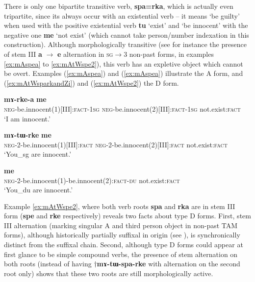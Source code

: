 \documentclass[oneside,a4paper,11pt]{article}
\newcommand{\ipa}[1]{{\phon\textbf{#1}}}
\newcommand{\jpg}[2]{\ipa{#1} `#2'}
\newcommand{\refb}[1]{(\ref{#1})}
\begin{document}
There is only one bipartite transitive verb, \ipa{spa=rka}, which is actually even tripartite, since its always occur with an existential verb -- it means `be guilty' when used with the positive existential verb \jpg{tu}{exist} and  `be innocent' with the negative one \jpg{me}{not exist} (which cannot take person/number indexation in this construction). Although morphologically transitive (see for instance the presence of stem III \ipa{a} $\rightarrow$ \ipa{e} alternation in \textsc{sg}$\rightarrow$3 non-past forms, in examples \ref{ex:mAspea} to \ref{ex:mAtWspe2}), this verb has an expletive object which cannot be overt. Examples \refb{ex:mAspea} and \refb{ex:mAspea} illustrate the A form, and \refb{ex:mAtWsparkandZi} and \refb{ex:mAtWspe2} the D form. 

\begin{exe}
\ex \label{ex:mAspea}
\gll \ipa{mɤ-spe-a} \ipa{mɤ-rke-a} \ipa{me} \\
\textsc{neg}-be.innocent(1)[III]:\textsc{fact}-\textsc{1sg} \textsc{neg}-be.innocent(2)[III]:\textsc{fact}-\textsc{1sg} not.exist:\textsc{fact} \\
\glt `I am innocent.'
\end{exe} 


\begin{exe}
\ex \label{ex:mAtWspe1}
\gll \ipa{mɤ-tɯ-spe} \ipa{mɤ-tɯ-rke} \ipa{me} \\
\textsc{neg}-2-be.innocent(1)[III]:\textsc{fact} \textsc{neg}-2-be.innocent(2)[III]:\textsc{fact} not.exist:\textsc{fact} \\
\glt `You_{sg} are innocent.'
\end{exe} 


\begin{exe}
\ex \label{ex:mAtWsparkandZi}
\gll \ipa{mɤ-tɯ-spa=rka-ndʑi} \ipa{me} \\
\textsc{neg}-2-be.innocent(1)-be.innocent(2):\textsc{fact}-\textsc{du} not.exist:\textsc{fact} \\
\glt `You_{du} are innocent.'
\end{exe} 

Example \ref{ex:mAtWspe2}, where both verb roots \ipa{spa} and \ipa{rka} are in stem III form (\ipa{spe} and \ipa{rke} respectively) reveals two facts about type D forms. First, stem III alternation (marking singular A and third person object in non-past TAM forms), although historically partially suffixal in origin (see \citealt[357]{jacques04these}), is synchronically distinct from the suffixal chain. Second, although type D forms could appear at first glance to be simple compound verbs, the presence of stem alternation on both roots (instead of having $\dagger$\ipa{mɤ-tɯ-spa-rke} with alternation on the second root only) shows that these two roots are still morphologically active.
\end{document}
